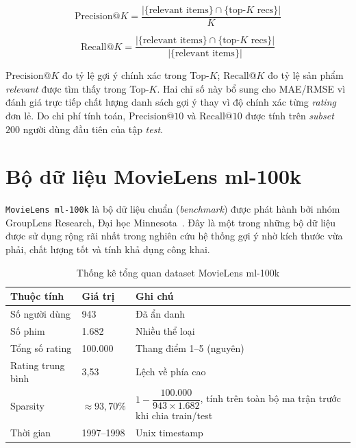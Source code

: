 \documentclass[../BTL.tex]{subfiles}
\begin{document}
\begin{equation}
    \text{Precision@}K =
        \frac{|\{\text{relevant items}\} \cap \{\text{top-}K\text{ recs}\}|}{K}
    \label{eq:precision}
\end{equation}

\begin{equation}
    \text{Recall@}K =
        \frac{|\{\text{relevant items}\} \cap \{\text{top-}K\text{ recs}\}|}
             {|\{\text{relevant items}\}|}
    \label{eq:recall}
\end{equation}

$\text{Precision@}K$ đo tỷ lệ gợi ý chính xác trong Top-$K$;
$\text{Recall@}K$ đo tỷ lệ sản phẩm \textit{relevant} được tìm thấy trong Top-$K$.
Hai chỉ số này bổ sung cho MAE/RMSE vì đánh giá trực tiếp chất lượng danh sách gợi
ý thay vì độ chính xác từng \textit{rating} đơn lẻ. Do chi phí tính toán,
$\text{Precision@10}$ và $\text{Recall@10}$ được tính trên \textit{subset} $200$
người dùng đầu tiên của tập \textit{test}.

\section{Bộ dữ liệu MovieLens ml-100k}
\label{section:2.5}

\texttt{MovieLens ml-100k} là bộ dữ liệu chuẩn (\textit{benchmark}) được phát hành
bởi nhóm GroupLens Research, Đại học Minnesota~\cite{harper2015movielens}. Đây là
một trong những bộ dữ liệu được sử dụng rộng rãi nhất trong nghiên cứu hệ thống
gợi ý nhờ kích thước vừa phải, chất lượng tốt và tính khả dụng công khai.

\begin{table}[H]
    \centering
    \caption{Thống kê tổng quan dataset MovieLens ml-100k}
    \label{tab:ml100k}
    \begin{tabular}{lll}
        \toprule
        \textbf{Thuộc tính} & \textbf{Giá trị} & \textbf{Ghi chú} \\
        \midrule
        Số người dùng     & 943              & Đã ẩn danh \\
        Số phim           & 1.682            & Nhiều thể loại \\
        Tổng số rating    & 100.000          & Thang điểm 1--5 (nguyên) \\
        Rating trung bình & 3,53             & Lệch về phía cao \\
        Sparsity          & $\approx 93{,}70\%$
                          & $1 - \dfrac{100.000}{943 \times 1.682}$,
                            tính trên toàn bộ ma trận trước khi chia train/test \\
        Thời gian         & 1997--1998       & Unix timestamp \\
        \bottomrule
    \end{tabular}
\end{table}
\end{document}
